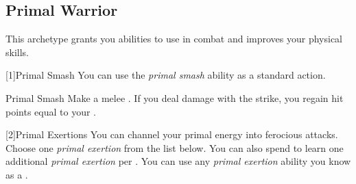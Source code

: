     \subsection{Primal Warrior}
        This archetype grants you abilities to use in combat and improves your physical skills.

        [1]{Primal Smash} You can use the \textit{primal smash} ability as a standard action.
        \begin{freeability}{Primal Smash}
            Make a melee .
            If you deal damage with the strike, you regain hit points equal to your .
        \end{freeability}

        [2]{Primal Exertions}
        You can channel your primal energy into ferocious attacks.
        Choose one \textit{primal exertion} from the list below.
        You can also spend  to learn one additional \textit{primal exertion} per .
        You can use any \textit{primal exertion} ability you know as a .
